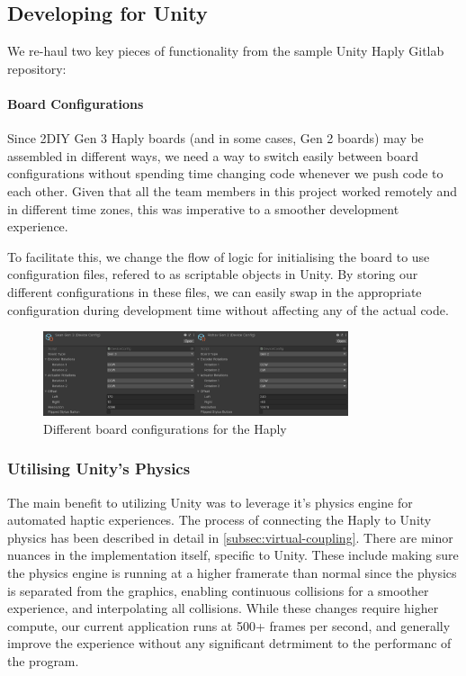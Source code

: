 \subsection{Developing for Unity}
We re-haul two key pieces of functionality from the sample Unity Haply Gitlab repository:
\paragraph{Board Configurations}
Since 2DIY Gen 3 Haply boards (and in some cases, Gen 2 boards) may be assembled in different ways, we need a way to switch easily between board configurations without spending time changing code whenever we push code to each other. Given that all the team members in this project worked remotely and in different time zones, this was imperative to a smoother development experience. 

To facilitate this, we change the flow of logic for initialising the board to use configuration files, refered to as scriptable objects in Unity. By storing our different configurations in these files, we can easily swap in the appropriate configuration during development time without affecting any of the actual code.

\begin{figure}
    \centering
    \includegraphics[width = 0.8\textwidth]{images/board-config.png}
    \caption{Different board configurations for the Haply}
    \label{fig:board-config}
\end{figure}

\subsubsection{Utilising Unity's Physics}
The main benefit to utilizing Unity was to leverage it's physics engine for automated haptic experiences. The process of connecting the Haply to Unity physics has been described in detail in \ref{subsec:virtual-coupling}. There are minor nuances in  the implementation itself, specific to Unity. These include making sure the physics engine is running at a higher framerate than normal since the physics is separated from the graphics, enabling continuous collisions for a smoother experience, and interpolating all collisions. While these changes require higher compute, our current application runs at 500+ frames per second, and generally improve the experience without any significant detrmiment to the performanc of the program.

